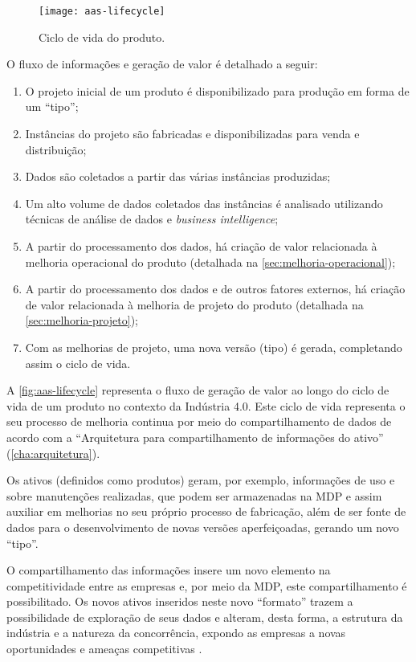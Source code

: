 \begin{figure}[htb!]
	\centering
	\texttt{[image: aas-lifecycle]}
	\caption{Ciclo de vida do produto.}
	\label{fig:aas-lifecycle}
\end{figure}

O fluxo de informações e geração de valor é detalhado a seguir:

\begin{enumerate}[label=(\alph*)]
	\item O projeto inicial de um produto é disponibilizado para produção em forma de um ``tipo'';
	\item Instâncias do projeto são fabricadas e disponibilizadas para venda e distribuição;
	\item Dados são coletados a partir das várias instâncias produzidas;
	\item Um alto volume de dados coletados das instâncias é analisado utilizando técnicas de análise de dados e \textit{business intelligence};
	\item A partir do processamento dos dados, há criação de valor relacionada à melhoria operacional do produto (detalhada na \autoref{sec:melhoria-operacional});
	\item A partir do processamento dos dados e de outros fatores externos, há criação de valor relacionada à melhoria de projeto do produto (detalhada na \autoref{sec:melhoria-projeto});
	\item Com as melhorias de projeto, uma nova versão (tipo) é gerada, completando assim o ciclo de vida.
\end{enumerate}

A \autoref{fig:aas-lifecycle} representa o fluxo de geração de valor ao longo do ciclo de vida de um produto no contexto da Indústria 4.0. Este ciclo de vida representa o seu processo de melhoria continua por meio do compartilhamento de dados de acordo com a ``Arquitetura para compartilhamento de informações do ativo'' (\autoref{cha:arquitetura}).

Os ativos (definidos como produtos) geram, por exemplo, informações de uso e sobre manutenções realizadas, que podem ser armazenadas na MDP e assim auxiliar em melhorias no seu próprio processo de fabricação, além de ser fonte de dados para o desenvolvimento de novas versões aperfeiçoadas, gerando um novo ``tipo''.

O compartilhamento das informações insere um novo elemento na competitividade entre as empresas \cite{framling2013plm} e, por meio da MDP, este compartilhamento é possibilitado. Os novos ativos inseridos neste novo ``formato'' trazem a possibilidade de exploração de seus dados e alteram, desta forma, a estrutura da indústria e a natureza da concorrência, expondo as empresas a novas oportunidades e ameaças competitivas \cite{porter2014smartproducts}.

